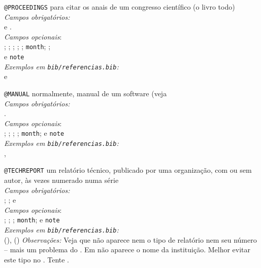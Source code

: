 \begin{alineas}
			
	\item \verb|@PROCEEDINGS| para citar os anais de um congresso
			científico (o livro todo)\\
		\emph{Campos obrigatórios:}\\
 			\hspace*{1em} e .\\
		\emph{Campos opcionais}:\\
			 \hspace*{1em}; ; ; 
			 ; ; \texttt{month}; ;\\
			\hspace*{1em} e \texttt{note}\\
		\emph{Exemplos em \texttt{bib/referencias.bib}:} \\
			 e \cite{conf:06} \\
			
	\item \verb|@MANUAL| normalmente, manual de um software (veja
		 \\
		\emph{Campos obrigatórios:}\\
 			\hspace*{1em}.\\
		\emph{Campos opcionais}:\\
			 \hspace*{1em};   ;
			 ; ; \texttt{month};
			 e \texttt{note}\\
		\emph{Exemplos em \texttt{bib/referencias.bib}:} \\
				, \cite{epslatex06}

	\item \verb|@TECHREPORT| um relatório técnico, publicado por
		uma organização, com ou sem autor, às vezes numerado numa
		série \\
		\emph{Campos obrigatórios:}\\
 			\hspace*{1em}; ; 
 			e \\
		\emph{Campos opcionais}:\\
			 \hspace*{1em};   ;
			 ; \texttt{month};
			e \texttt{note}\\
		\emph{Exemplos em \texttt{bib/referencias.bib}:} \\
				 (), \cite{dnit06}
				()
		\emph{Observações:} Veja que não aparece nem o tipo de relatório
		nem seu número -- mais um problema do . Em 
		 não aparece o nome da instituição. Melhor evitar
		este tipo no .	Tente .		
								

\end{alineas}
